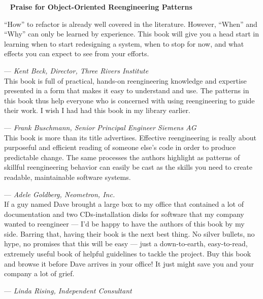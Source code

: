 \documentclass[a4paper,10pt,twoside]{book}
\begin{document}
	\frontmatter
	\sloppy
\fi
~ %
\vfill
\noindent
{\large \bf Praise for Object-Oriented Reengineering Patterns}

\vspace{1cm}

\noindent
``How'' to refactor is already well covered in the literature. However, ``When'' and ``Why'' can only be learned by experience. This book will give you a head start in learning when to start redesigning a system, when to stop for now, and what effects you can expect to see from your efforts.

\hfill--- \emph{Kent Beck, Director, Three Rivers Institute}\\[0.2cm]

\noindent
This book is full of practical, hands-on reengineering knowledge and expertise presented in a form that makes it easy to understand and use. The patterns in this book thus help everyone who is concerned with using reengineering to guide their work. I wish I had had this book in my library earlier.

\hfill--- \emph{Frank Buschmann, Senior Principal Engineer Siemens AG}\\[0.2cm]

\noindent
This book is more than its title advertises. Effective reengineering is really about purposeful and efficient reading of someone else's code in order to produce predictable change. The same processes the authors highlight as patterns of skillful reengineering behavior can easily be cast as the skills you need to create readable, maintainable software systems.

\hfill--- \emph{Adele Goldberg, Neometron, Inc.}\\[0.2cm]

\noindent
If a guy named Dave brought a large box to my office that contained a lot of documentation and two CDs-installation disks for software that my company wanted to reengineer --- I'd be happy to have the authors of this book by my side. Barring that, having their book is the next best thing. No silver bullets, no hype, no promises that this will be easy --- just a down-to-earth, easy-to-read, extremely useful book of helpful guidelines to tackle the project. Buy this book and browse it before Dave arrives in your office! It just might save you and your company a lot of grief.

\hfill--- \emph{Linda Rising, Independent Consultant}

\vfill

\ifx\wholebook\relax\else
   
   
   
\end{document}
